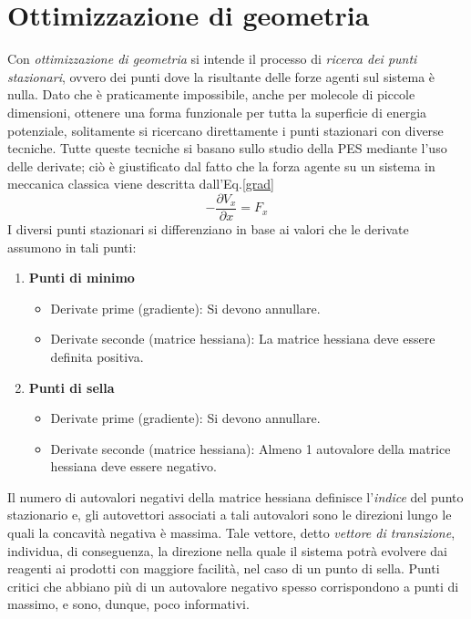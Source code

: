 \documentclass[oneside]{amsbook}
\numberwithin{section}{chapter}
\numberwithin{equation}{section}
\numberwithin{figure}{section}
\begin{document}
\section{Ottimizzazione di geometria}
Con \emph{ottimizzazione di geometria} si intende il processo di \emph{ricerca dei punti stazionari}, ovvero dei punti dove la risultante delle forze agenti sul sistema è nulla. Dato che è praticamente impossibile, anche per molecole di piccole dimensioni, ottenere una forma funzionale per tutta la superficie di energia potenziale, solitamente si ricercano direttamente i  punti stazionari con diverse tecniche. Tutte queste tecniche si basano sullo studio della PES mediante l'uso delle derivate; ciò è giustificato dal fatto che la forza agente su un sistema in meccanica classica viene descritta dall'Eq.\ref{grad}
\begin{equation}
\label{grad}
-\frac{\partial{V_x}}{\partial{x}}=F_x
\end{equation}
I diversi punti stazionari si differenziano in base ai valori che le derivate assumono in tali punti:
\begin{enumerate}
\item \textbf{Punti di minimo}
\begin{itemize}
\item Derivate prime (gradiente): Si devono annullare.
\item Derivate seconde (matrice hessiana): La matrice hessiana deve essere definita positiva.
\end{itemize}
\item \textbf{Punti di sella}
\begin{itemize}
\item Derivate prime (gradiente): Si devono annullare.
\item Derivate seconde (matrice hessiana): Almeno 1 autovalore della  matrice hessiana deve essere negativo.
\end{itemize}
\end{enumerate}
Il numero di autovalori negativi della matrice hessiana definisce l'\emph{indice} del punto stazionario e, gli autovettori associati a tali autovalori sono le direzioni lungo le quali la concavità negativa è massima. Tale vettore, detto \emph{vettore di transizione}, individua, di conseguenza, la direzione nella quale il sistema potrà evolvere dai reagenti ai prodotti con maggiore facilità, nel caso di un punto di sella. Punti critici che abbiano più di un autovalore negativo spesso corrispondono a punti di massimo, e sono, dunque, poco informativi.\\
\end{document}
